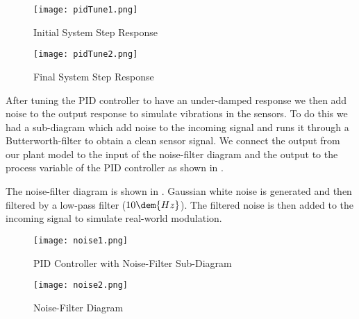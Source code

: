 \documentclass[main.tex]{subfile}
\begin{document}
\begin{figure}[h]
	\begin{center}
		\texttt{[image: pidTune1.png]}
	\end{center}
	\caption{Initial System Step Response}
	\label{fig:pidTune1}
\end{figure}

\begin{figure}[h]
	\begin{center}
		\texttt{[image: pidTune2.png]}
	\end{center}
	\caption{Final System Step Response}
	\label{fig:pidTune2}
\end{figure}

After tuning the PID controller to have an under-damped response we then add
noise to the output response to simulate vibrations in the sensors. To do this
we had a sub-diagram which add noise to the incoming signal and runs it through
a Butterworth-filter to obtain a clean sensor signal. We connect the output from
our plant model to the input of the noise-filter diagram and the output to the
process variable of the PID controller as shown in .

The noise-filter diagram is shown in . Gaussian white noise is
generated and then filtered by a low-pass filter ($10\dem{Hz}$). The filtered
noise is then added to the incoming signal to simulate real-world modulation.

\begin{figure}[h]
	\begin{center}
		\texttt{[image: noise1.png]}
	\end{center}
	\caption{PID Controller with Noise-Filter Sub-Diagram}
	\label{fig:noise1}
\end{figure}

\begin{figure}[h]
	\begin{center}
		\texttt{[image: noise2.png]}
	\end{center}
	\caption{Noise-Filter Diagram}
	\label{fig:noise2}
\end{figure}

\end{document}

